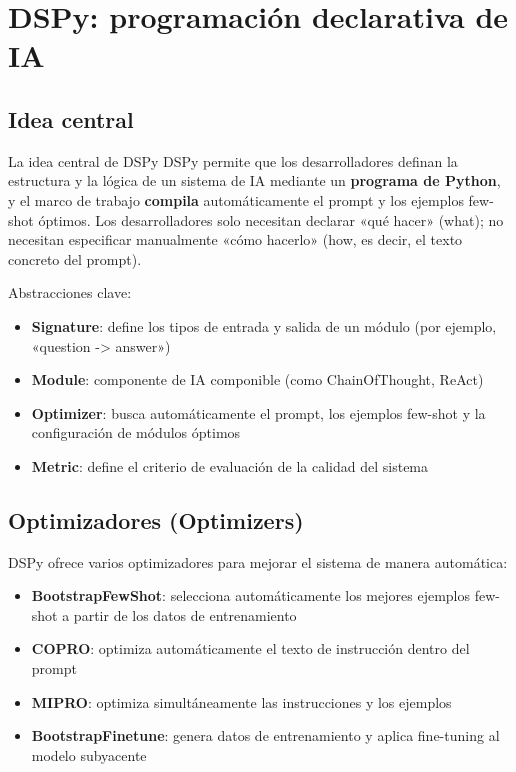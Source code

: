\section{DSPy: programación declarativa de IA}

\subsection{Idea central}

\begin{importantbox}{La idea central de DSPy}
DSPy permite que los desarrolladores definan la estructura y la lógica de un sistema de IA mediante un \textbf{programa de Python}, y el marco de trabajo \textbf{compila} automáticamente el prompt y los ejemplos few-shot óptimos. Los desarrolladores solo necesitan declarar «qué hacer» (what); no necesitan especificar manualmente «cómo hacerlo» (how, es decir, el texto concreto del prompt).
\end{importantbox}

Abstracciones clave:
\begin{itemize}
    \item \textbf{Signature}: define los tipos de entrada y salida de un módulo (por ejemplo, «question -> answer»)
    \item \textbf{Module}: componente de IA componible (como ChainOfThought, ReAct)
    \item \textbf{Optimizer}: busca automáticamente el prompt, los ejemplos few-shot y la configuración de módulos óptimos
    \item \textbf{Metric}: define el criterio de evaluación de la calidad del sistema
\end{itemize}

\subsection{Optimizadores (Optimizers)}

DSPy ofrece varios optimizadores para mejorar el sistema de manera automática:

\begin{itemize}
    \item \textbf{BootstrapFewShot}: selecciona automáticamente los mejores ejemplos few-shot a partir de los datos de entrenamiento
    \item \textbf{COPRO}: optimiza automáticamente el texto de instrucción dentro del prompt
    \item \textbf{MIPRO}: optimiza simultáneamente las instrucciones y los ejemplos
    \item \textbf{BootstrapFinetune}: genera datos de entrenamiento y aplica fine-tuning al modelo subyacente
\end{itemize}

